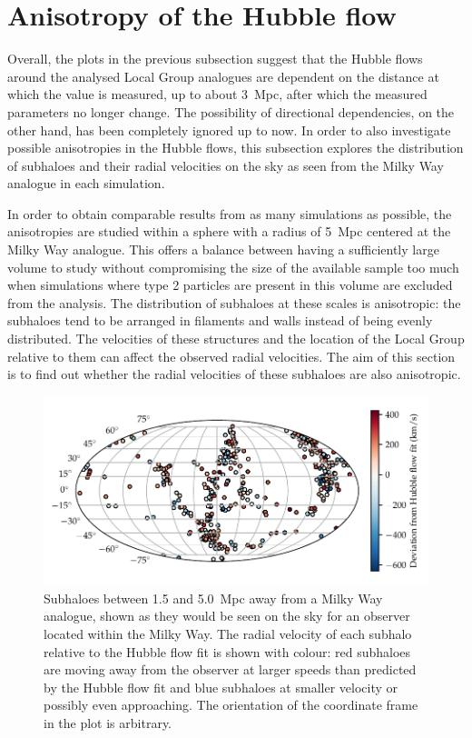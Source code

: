 \documentclass[english, twoside]{HYgradu}
\begin{document}
\section{Anisotropy of the Hubble flow} \label{sect:hf-anisotropy}
Overall, the plots in the previous subsection suggest that the Hubble flows around the analysed Local Group analogues are dependent on the distance at which the value is measured, up to about 3~Mpc, after which the measured parameters no longer change. The possibility of directional dependencies, on the other hand, has been completely ignored up to now. In order to also investigate possible anisotropies in the Hubble flows, this subsection explores the distribution of subhaloes and their radial velocities on the sky as seen from the Milky Way analogue in each simulation.

In order to obtain comparable results from as many simulations as possible, the anisotropies are studied within a sphere with a radius of 5~Mpc centered at the Milky Way analogue. This offers a balance between having a sufficiently large volume to study without compromising the size of the available sample too much when simulations where type 2 particles are present in this volume are excluded from the analysis. The distribution of subhaloes at these scales is anisotropic: the subhaloes tend to be arranged in filaments and walls instead of being evenly distributed. The velocities of these structures and the location of the Local Group relative to them can affect the observed radial velocities. The aim of this section is to find out whether the radial velocities of these subhaloes are also anisotropic. %

\begin{figure}
    \centering
    \includegraphics{kuvat/mollweide-anisotropy.pdf}
    \caption{Subhaloes between 1.5 and 5.0~Mpc away from a Milky Way analogue, shown as they would be seen on the sky for an observer located within the Milky Way.  The radial velocity of each subhalo relative to the Hubble flow fit is shown with colour: red subhaloes are moving away from the observer at larger speeds than predicted by the Hubble flow fit and blue subhaloes at smaller velocity or possibly even approaching. The orientation of the coordinate frame in the plot is arbitrary.}\label{fig:mollweide-anisotropy}
\end{figure}
\end{document}
